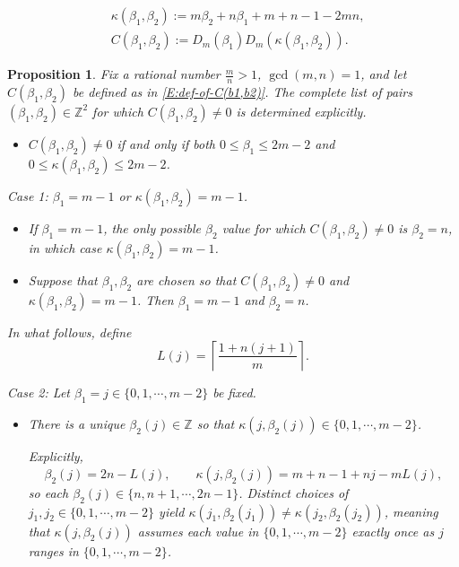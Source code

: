 \documentclass[10pt,a4paper]{amsart}
\newtheorem{proposition}{Proposition}
\newcommand{\Z}{{\mathbb Z}}
\begin{document}
\begin{align}
&\kappa(\beta_1,\beta_2) := m\beta_2+n\beta_1 + m + n -1 -2mn, \label{E:def-of-kappa(b1,b2)} \\
&C(\beta_1,\beta_2) := D_m(\beta_1) D_m(\kappa(\beta_1,\beta_2)). \label{E:def-of-C(b1,b2)}
\end{align}

\begin{proposition}\label{P:Finding-effective-coefficients}
Fix a rational number $\frac{m}{n}>1$, $\gcd(m,n)=1$, and let $C(\beta_1,\beta_2)$ be defined as in \eqref{E:def-of-C(b1,b2)}.
The complete list of pairs $(\beta_1,\beta_2) \in \Z^2$ for which $C(\beta_1,\beta_2) \neq 0$ is determined explicitly.

\begin{itemize}
\item[(0)] $C(\beta_1,\beta_2) \neq 0$ if and only if both $0 \le \beta_1 \le 2m-2$ and $0 \le \kappa(\beta_1,\beta_2) \le 2m-2$.
\end{itemize}

\noindent  Case 1: $\beta_1 = m-1$ or $\kappa(\beta_1,\beta_2) = m-1$.

\begin{itemize}
\item[(1a)] If $\beta_1 = m-1$, the only possible $\beta_2$ value for which $C(\beta_1,\beta_2) \neq 0$ is $\beta_2 = n$, in which case $\kappa(\beta_1,\beta_2) = m-1$.

\item[(1b)] Suppose that $\beta_1,\beta_2$ are chosen so that $C(\beta_1,\beta_2) \neq 0$ and $\kappa(\beta_1,\beta_2) = m-1$.
Then $\beta_1 = m-1$ and $\beta_2 = n$.
\end{itemize}

In what follows, define 
\begin{equation}\label{E:def-of-mn-ceiling-func}
L(j) = \left\lceil \frac{1+n(j+1)}{m} \right\rceil.
\end{equation}

\noindent  Case 2: Let $\beta_1 = j \in \{0,1,\cdots,m-2 \}$ be fixed.
\begin{itemize}

\item[(2a)] 
There is a unique $\beta_2(j) \in \Z$ so that $\kappa(j,\beta_2(j)) \in \{0,1,\cdots,m-2 \}$.

Explicitly, 
\begin{equation}
\beta_2(j) = 2n - L(j), \qquad \kappa(j,\beta_2(j)) = m + n -1 + nj - m L(j),
\end{equation}
so each $\beta_2(j) \in \{n,n+1, \cdots, 2n-1 \}$.
Distinct choices of $j_1,j_2 \in \{0,1,\cdots,m-2 \}$ yield $\kappa(j_1,\beta_2(j_1)) \neq \kappa(j_2,\beta_2(j_2))$, meaning that $\kappa(j,\beta_2(j))$ assumes each value in $\{0,1,\cdots,m-2 \}$ exactly once as $j$ ranges in $\{0,1,\cdots,m-2 \}$.


\end{itemize}
\end{proposition}
\end{document}
